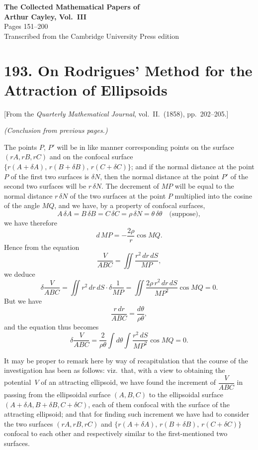 \documentclass[12pt,a4paper]{article}
\theoremstyle{definition}
\begin{document}
\begin{center}
{\Large\bfseries The Collected Mathematical Papers of\\[0.5em] Arthur Cayley, Vol.~III}\\[2em]
{\large Pages 151--200}\\[1em]
{\normalsize Transcribed from the Cambridge University Press edition}
\end{center}

\vspace{2em}

\tableofcontents
\newpage


\section*{193. On Rodrigues' Method for the Attraction of Ellipsoids}

\begin{center}
[From the \textit{Quarterly Mathematical Journal}, vol.~II.~(1858), pp.~202--205.]
\end{center}

\bigskip

\noindent\textit{(Conclusion from previous pages.)}

\medskip

The points $P$, $P'$ will be in like manner corresponding points on the surface
$(rA, rB, rC)$ and on the confocal surface $\{r(A+\delta A),\, r(B+\delta B),\, r(C+\delta C)\}$;
and if the normal distance at the point $P$ of the first two surfaces is $\delta N$, then
the normal distance at the point $P'$ of the second two surfaces will be $r\,\delta N$.
The decrement of $MP$ will be equal to the normal distance $r\,\delta N$ of the two
surfaces at the point $P$ multiplied into the cosine of the angle $MQ$, and we have,
by a property of confocal surfaces,
\[
A\,\delta A = B\,\delta B = C\,\delta C = \rho\,\delta N = \theta\,\delta\theta \quad\text{(suppose)},
\]
we have therefore
\[
d\,MP = -\frac{2\rho}{r}\cos MQ.
\]
Hence from the equation
\[
\frac{V}{ABC} = \iint \frac{r^2\,dr\,dS}{MP},
\]
we deduce
\[
\delta\frac{V}{ABC} = \iint r^2\,dr\,dS \cdot \delta\frac{1}{MP}
= \iint \frac{2\rho\,r^2\,dr\,dS}{MP^2}\cos MQ = 0.
\]
But we have
\[
\frac{r\,dr}{ABC} = \frac{d\theta}{\rho\theta},
\]
and the equation thus becomes
\[
\delta\frac{V}{ABC} = \frac{2}{\rho\theta}\int d\theta \int \frac{r^2\,dS}{MP^2}\cos MQ = 0.
\]

It may be proper to remark here by way of recapitulation that the course of the
investigation has been as follows: viz.\ that, with a view to obtaining the potential~$V$
of an attracting ellipsoid, we have found the increment of $\dfrac{V}{ABC}$ in passing from the
ellipsoidal surface $(A, B, C)$ to the ellipsoidal surface $(A+\delta A, B+\delta B, C+\delta C)$,
each of them confocal with the surface of the attracting ellipsoid; and that for finding
such increment we have had to consider the two surfaces $(rA, rB, rC)$ and
$\{r(A+\delta A),\, r(B+\delta B),\, r(C+\delta C)\}$ confocal to each other and respectively
similar to the first-mentioned two surfaces.
\end{document}
